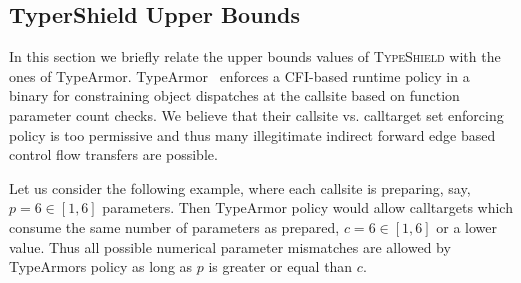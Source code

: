 
\subsection{TyperShield Upper Bounds}
\label{RQ6:TyperArmor's Imprecise Parameter-Count Policy}
\label{Too Permissive Parameter-Based Policies}
In this section we briefly relate the upper bounds values of \textsc{TypeShield} with the ones of TypeArmor.
TypeArmor~\cite{veen:typearmor} enforces a CFI-based runtime policy in a binary for constraining object dispatches at the callsite based on
function parameter count checks.
We believe that their callsite vs. calltarget set enforcing policy is too permissive and thus
many illegitimate indirect forward edge based control flow transfers are possible. 

Let us consider the following example, where each callsite is
preparing, say, $p=6 \in [1, 6]$ parameters. Then TypeArmor policy would allow calltargets which consume the same number of parameters as
prepared, $c=6 \in [1, 6]$ or a lower value. Thus all possible numerical parameter mismatches are allowed by TypeArmors policy as long
as $p$ is greater or equal than $c$.

